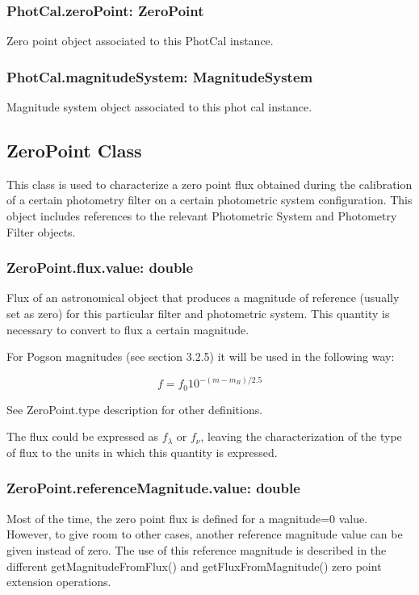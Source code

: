\documentclass[11pt,a4paper]{ivoa}
\begin{document}
\subsubsection{PhotCal.zeroPoint: ZeroPoint}
Zero point object associated to this PhotCal instance.
\par

\subsubsection{PhotCal.magnitudeSystem: MagnitudeSystem}
Magnitude system object associated to this phot cal instance.
\par

\subsection{ZeroPoint Class}
This class is used to characterize a zero point flux obtained during the calibration of a certain photometry filter on a certain photometric system configuration. This object includes references to the relevant Photometric System and Photometry Filter objects.
\par

\subsubsection{ZeroPoint.flux.value: double}
Flux of an astronomical object that produces a magnitude of reference (usually set as zero) for this particular filter and photometric system. This quantity is necessary to convert to flux a certain magnitude. 
\par

For Pogson magnitudes (see section 3.2.5) it will be used in the following way:
\par
\[
f = f_0 10^{-(m-m_R )/2.5}
\]

See ZeroPoint.type description for other definitions.
\par

The flux could be expressed as $f_{\lambda}$ or $f_{\nu}$, leaving the characterization of the type of flux to the units in which this quantity is expressed. 
\par

\subsubsection{ZeroPoint.referenceMagnitude.value: double}
Most of the time, the zero point flux is defined for a magnitude=0 value. However, to give room to other cases, another reference magnitude value can be given instead of zero. The use of this reference magnitude is described in the different getMagnitudeFromFlux() and getFluxFromMagnitude() zero point extension operations. 
\par
\end{document}

